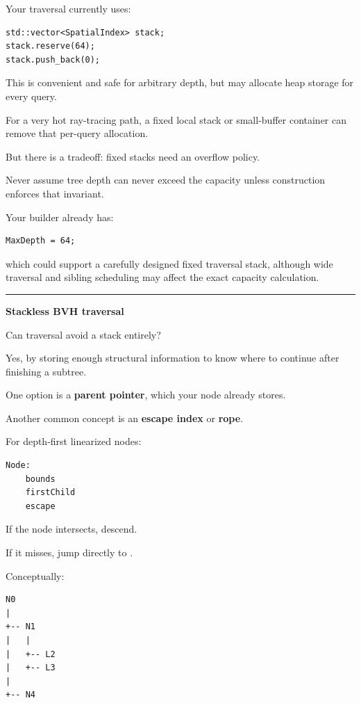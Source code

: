 Your traversal currently uses:

\begin{verbatim}
std::vector<SpatialIndex> stack;
stack.reserve(64);
stack.push_back(0);
\end{verbatim}

This is convenient and safe for arbitrary depth, but  may allocate heap storage for every query.

For a very hot ray-tracing path, a fixed local stack or small-buffer container can remove that per-query allocation.

But there is a tradeoff: fixed stacks need an overflow policy.

Never assume tree depth can never exceed the capacity unless construction enforces that invariant.

Your builder already has:

\begin{verbatim}
MaxDepth = 64;
\end{verbatim}

which could support a carefully designed fixed traversal stack, although wide traversal and sibling scheduling may affect the exact capacity calculation.

\begin{center}\rule{0.5\linewidth}{0.5pt}\end{center}

\textbf{Stackless BVH traversal}

Can traversal avoid a stack entirely?

Yes, by storing enough structural information to know where to continue after finishing a subtree.

One option is a \textbf{parent pointer}, which your node already stores.

Another common concept is an \textbf{escape index} or \textbf{rope}.

For depth-first linearized nodes:

\begin{verbatim}
Node:
    bounds
    firstChild
    escape
\end{verbatim}

If the node intersects, descend.

If it misses, jump directly to .

Conceptually:

\begin{verbatim}
N0
|
+-- N1
|   |
|   +-- L2
|   +-- L3
|
+-- N4
\end{verbatim}

